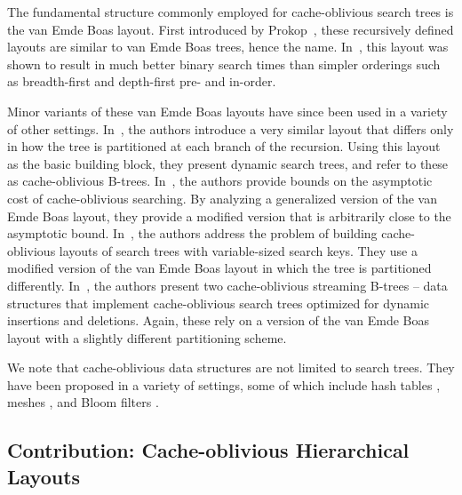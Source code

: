 \documentclass[10pt,conference,letterpaper]{IEEEtran}
\newcommand{\comment}[1]{}
\newcommand{\vEBl}{van Emde Boas layout\xspace}
\newcommand{\vEBls}{van Emde Boas layouts\xspace}
\begin{document}
The fundamental structure commonly employed for cache-oblivious search trees is the \vEBl. First introduced by Prokop~\cite{Prokop}, these recursively defined layouts are similar to van Emde Boas trees, hence the name. 
In~\cite{Brodal:COSearch-vEBLayout}, this layout was shown to result in much better binary search times than simpler orderings such as breadth-first and depth-first pre- and in-order.
\comment{
, and has been used (with minor variations) ever since to design cache-oblivious search trees.
}
Minor variants of these \vEBls have since been used in a variety of other settings. 
In~\cite{Bender05}, the authors introduce a very similar layout that differs only in how the tree is partitioned at each branch of the recursion. Using this layout as the basic building block, they present dynamic search trees, and refer to these as cache-oblivious B-trees. In~\cite{Bender:COSearchCost}, the authors provide bounds on the asymptotic cost of cache-oblivious searching. By analyzing a generalized version of the \vEBl, they provide a modified version that is arbitrarily close to the asymptotic bound. 
In~\cite{Bender:COStringBT,Bender:BTDiffKeys}, the authors address the problem of building cache-oblivious layouts of search trees with variable-sized search keys. They use a modified version of the \vEBl in which the tree is partitioned differently. In~\cite{Bender:COStreamingBT}, the authors present two cache-oblivious streaming B-trees -- data structures that implement cache-oblivious search trees optimized for dynamic insertions and deletions. Again, these rely on a version of the \vEBl with a slightly different partitioning scheme.
\comment{
An alternate approach for handling multi-level caches is to design algorithms rather than data structures that are cache-oblivious. In \cite{Frigo:COAlgos}, the authors present asymptotically optimal cache-oblivious algorithms for many commonly used subroutines such as sorting and fast Fourier transforms. Building upon previous work, Brodal and Fagerberg~\cite{Brodal:CODisSweep} present cache-oblivious versions for many divide-and-conquer algorithms.
}
We note that cache-oblivious data structures are not limited to search trees. They have been proposed in a variety of settings, some of which include hash tables \cite{Pagh:COHash}, meshes \cite{Yoon05,Bender:COMesh}, and Bloom filters \cite{Bender:COBloomFilter}.

\subsection{Contribution: Cache-oblivious Hierarchical Layouts}
\end{document}
